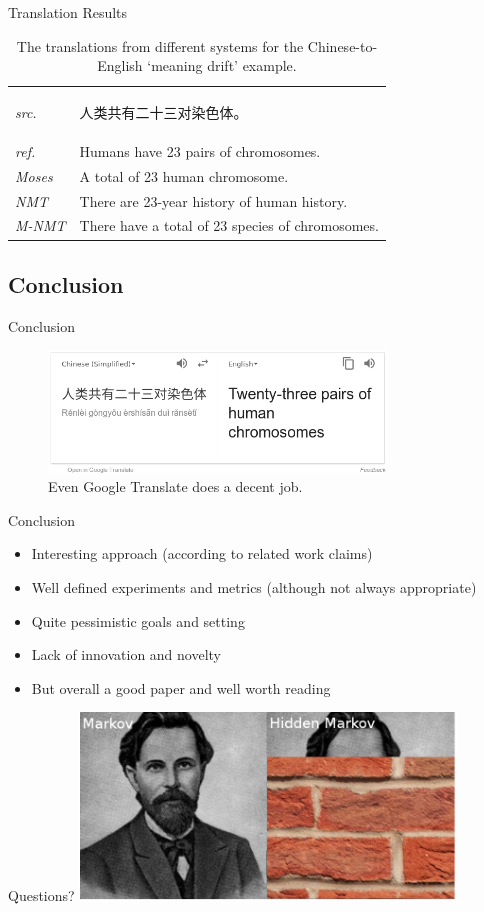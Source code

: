 \documentclass{beamer}
\begin{document}
\begin{frame}{Translation Results}
\begin{table}
\centering
\begin{tabular}{ll}
\hline
\textit{src.} & \begin{CJK}{UTF8}{gbsn}人类共有二十三对染色体。\end{CJK}\\
\textit{ref.} & Humans have 23 pairs of chromosomes.\\
\textit{Moses} & A total of 23 human chromosome.\\
\textit{NMT} & There are 23-year history of human history.\\
\textit{M-NMT} & There have a total of 23 species of chromosomes.\\
\hline
\end{tabular}
\caption{The translations from different systems for the Chinese-to-English ‘meaning drift’ example.}
\end{table}
\end{frame}

\subsection{Conclusion}
\begin{frame}{Conclusion}
\begin{figure}
\centering
\includegraphics[width=9cm]{google-translate}
\caption{Even Google Translate does a decent job.}
\end{figure}
\end{frame}

\begin{frame}{Conclusion}
\begin{itemize}
\item Interesting approach (according to related work claims)
\item Well defined experiments and metrics (although not always appropriate)
\item Quite pessimistic goals and setting
\item Lack of innovation and novelty
\item But overall a good paper and well worth reading
\end{itemize}
\end{frame}

\begin{frame}{Questions?}
\centering
\includegraphics[width=10cm]{markov}
\end{frame}
\end{document}
